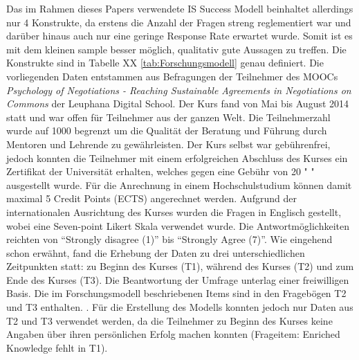 Das im Rahmen dieses Papers verwendete IS Success Modell beinhaltet allerdings nur 4 Konstrukte, da erstens die Anzahl der Fragen streng reglementiert war und darüber hinaus auch nur eine geringe Response Rate erwartet wurde. Somit ist es mit dem kleinen sample besser möglich, qualitativ gute Aussagen zu treffen. Die Konstrukte sind in Tabelle XX \ref{tab:Forschungsmodell} genau definiert. Die vorliegenden Daten entstammen aus Befragungen der Teilnehmer des MOOCs  \textit{Psychology of Negotiations - Reaching Sustainable Agreements in Negotiations on Commons}  der Leuphana Digital School. Der Kurs fand von Mai bis August 2014 statt und war offen für Teilnehmer aus der ganzen Welt. Die Teilnehmerzahl wurde auf 1000 begrenzt um die Qualität der Beratung und Führung durch Mentoren und Lehrende zu gewährleisten. Der Kurs selbst war gebührenfrei, jedoch konnten die Teilnehmer mit einem erfolgreichen Abschluss des Kurses ein Zertifikat der Universität erhalten, welches gegen eine Gebühr von 20 \texteuro " " ausgestellt wurde. Für die Anrechnung in einem Hochschulstudium können damit maximal 5 Credit Points (ECTS) angerechnet werden. Aufgrund der internationalen Ausrichtung des Kurses wurden die Fragen in Englisch gestellt, wobei eine Seven-point Likert Skala verwendet wurde. Die Antwortmöglichkeiten reichten von "`Strongly disagree (1)"' bis "`Strongly Agree (7)"'. Wie eingehend schon erwähnt, fand die Erhebung der Daten zu drei unterschiedlichen Zeitpunkten statt: zu Beginn des Kurses (T1), während des Kurses (T2) und zum Ende des Kurses (T3). Die Beantwortung der Umfrage unterlag einer freiwilligen Basis. Die im Forschungsmodell beschriebenen Items sind in den Fragebögen T2 und T3 enthalten. .
Für die Erstellung des Modells konnten jedoch nur Daten aus T2 und T3 verwendet werden, da die Teilnehmer zu Beginn des Kurses keine Angaben über ihren persönlichen Erfolg machen konnten (Frageitem: Enriched Knowledge fehlt in T1). 
 


